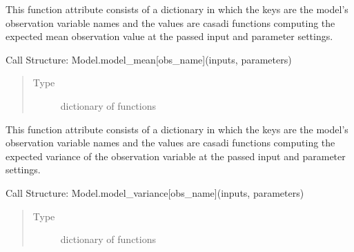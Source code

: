 \documentclass[letterpaper,10pt,english,openany,oneside]{sphinxmanual}
\begin{document}
\begin{fulllineitems}
\begin{fulllineitems}
\end{fulllineitems}


\begin{fulllineitems}
\label{\detokenize{nloed:nloed.model.Model.model_mean}}
This function attribute consists of a
dictionary in which the keys are the model’s observation variable names and the values
are casadi functions computing the expected mean observation value at the passed input
and parameter settings.

Call Structure: Model.model\_mean{[}obs\_name{]}(inputs, parameters)
\begin{quote}\begin{description}
\item[{Type}] \leavevmode
dictionary of functions

\end{description}\end{quote}

\end{fulllineitems}


\begin{fulllineitems}
\label{\detokenize{nloed:nloed.model.Model.model_variance}}
This function attribute consists of a
dictionary in which the keys are the model’s observation variable names and the values
are casadi functions computing the expected variance of the observation variable at the
passed input and parameter settings.

Call Structure: Model.model\_variance{[}obs\_name{]}(inputs, parameters)
\begin{quote}\begin{description}
\item[{Type}] \leavevmode
dictionary of functions

\end{description}\end{quote}

\end{fulllineitems}



\end{fulllineitems}
\end{document}
